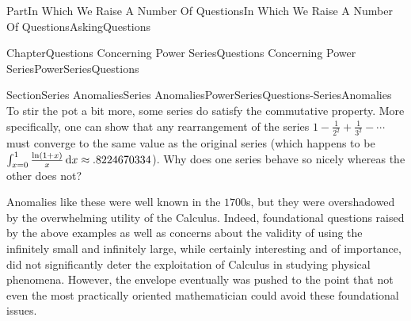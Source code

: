 \documentclass[oneside,10pt,]{book}
\numberwithin{equation}{part}
\newcommand{\dx}[1]{\,{\rm d}#1}
\begin{document}
\begin{partptx}{Part}{In Which We Raise A Number Of Questions}{}{In Which We Raise A Number Of Questions}{}{}{AskingQuestions}
\begin{chapterptx}{Chapter}{Questions Concerning Power Series}{}{Questions Concerning Power Series}{}{}{PowerSeriesQuestions}
\begin{sectionptx}{Section}{Series Anomalies}{}{Series Anomalies}{}{}{PowerSeriesQuestions-SeriesAnomalies}
To stir the pot a bit more, some series do satisfy the commutative property.  More specifically, one can show that any rearrangement of the series \(1-\frac{1}{2^2}+\frac{1}{3^2}-\cdots\) must converge to the same value as the original series (which happens to be \(\int_{x=0}^1\frac{\ln(1+x)}{x}\dx{x}\approx.8224670334\)).  Why does one series behave so nicely whereas the other does not?%
\par
Anomalies like these were well known in the \(1700\)s, but they were overshadowed by the overwhelming utility of the Calculus.  Indeed, foundational questions raised by the above examples as well as concerns about the validity of using the infinitely small and infinitely large, while certainly interesting and of importance, did not significantly deter the exploitation of Calculus in studying physical phenomena. However, the envelope eventually was pushed to the point that not even the most practically oriented mathematician could avoid these foundational issues.%
\end{sectionptx}
\end{chapterptx}
\end{partptx}
%
%
\typeout{************************************************}
\typeout{************************************************}
%
\end{document}
